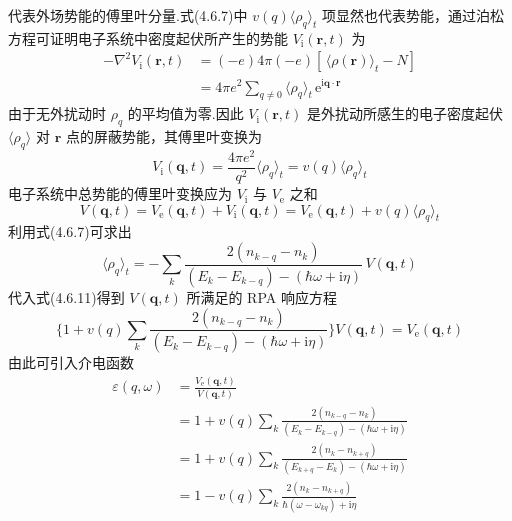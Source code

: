 代表外场势能的傅里叶分量.式(4.6.7)中 $v(q)\langle\rho_{q}\rangle_{t}$ 项显然也代表势能，通过泊松方程可证明电子系统中密度起伏所产生的势能 $V_{\mathrm{i}}(\boldsymbol{r},t)$ 为
\begin{equation}
\begin{aligned}
  -\nabla^{2}V_{\mathrm{i}}(\boldsymbol{r},t)
  &=(-e)4\pi(-e)\left[\,\langle\rho(\boldsymbol{r})\rangle_{t}-N\right]\\
  &=4\pi e^{2}\sum_{q\neq 0}\langle\rho_{q}\rangle_{t}\,
  \mathrm{e}^{\mathrm{i}\boldsymbol{q}\cdot\boldsymbol{r}}
\end{aligned}
\end{equation}
由于无外扰动时 $\rho_{q}$ 的平均值为零.因此 $V_{\mathrm{i}}(\boldsymbol{r},t)$ 是外扰动所感生的电子密度起伏 $\langle\rho_{q}\rangle$ 对 $\boldsymbol{r}$ 点的屏蔽势能，其傅里叶变换为
\begin{equation}
  V_{\mathrm{i}}(\boldsymbol{q},t)=\frac{4\pi e^{2}}{q^{2}}\langle\rho_{q}\rangle_{t}
  =v(q)\langle\rho_{q}\rangle_{t}
\end{equation}
电子系统中总势能的傅里叶变换应为 $V_{\mathrm{i}}$ 与 $V_{\mathrm{e}}$ 之和
\begin{equation}
  V(\boldsymbol{q},t)=V_{\mathrm{e}}(\boldsymbol{q},t)+V_{\mathrm{i}}(\boldsymbol{q},t)
  =V_{\mathrm{e}}(\boldsymbol{q},t)+v(q)\langle\rho_{q}\rangle_{t}
\end{equation}
利用式(4.6.7)可求出
\begin{equation}
  \langle\rho_{q}\rangle_{t}=-\sum_{k}
  \frac{2\left(n_{k-q}-n_{k}\right)}
  {\left(E_{k}-E_{k-q}\right)-\left(\hbar\omega+\mathrm{i}\eta\right)}\,V(\boldsymbol{q},t)
\end{equation}
代入式(4.6.11)得到 $V(\boldsymbol{q},t)$ 所满足的 RPA 响应方程
\begin{equation}
  \bigg\{1+v(q)\sum_{k}
  \frac{2\left(n_{k-q}-n_{k}\right)}
  {\left(E_{k}-E_{k-q}\right)-\left(\hbar\omega+\mathrm{i}\eta\right)}\bigg\}
  V(\boldsymbol{q},t)=V_{\mathrm{e}}(\boldsymbol{q},t)
\end{equation}
由此可引入介电函数
\begin{equation}
\begin{aligned}
  \varepsilon(q,\omega)&=\frac{V_{\mathrm{e}}(\boldsymbol{q},t)}{V(\boldsymbol{q},t)}\\
  &=1+v(q)\sum_{k}\frac{2\left(n_{k-q}-n_{k}\right)}
  {\left(E_{k}-E_{k-q}\right)-\left(\hbar\omega+\mathrm{i}\eta\right)}\\
  &=1+v(q)\sum_{k}\frac{2\left(n_{k}-n_{k+q}\right)}
  {\left(E_{k+q}-E_{k}\right)-\left(\hbar\omega+\mathrm{i}\eta\right)}\\
  &=1-v(q)\sum_{k}\frac{2\left(n_{k}-n_{k+q}\right)}
  {\hbar\left(\omega-\omega_{kq}\right)+\mathrm{i}\eta}
\end{aligned}
\end{equation}

